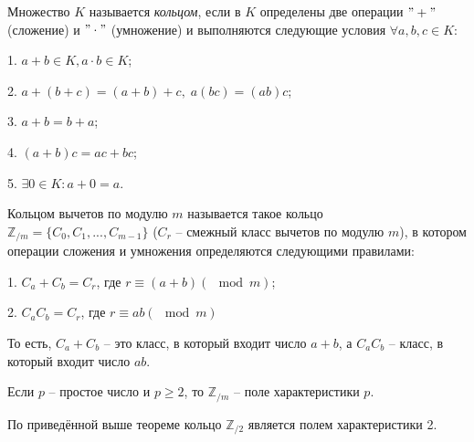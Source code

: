 Множество $K$ называется \emph{кольцом}, если в $K$ определены две операции $"+"$ (сложение) и $"\cdot"$ (умножение) и выполняются следующие условия $\forall a, b, c \in K$:

1. $a + b \in K, a \cdot b \in K$;

2. $a+(b+c) = (a+b)+c, \; a(bc) = (ab)c$;

3. $a+b = b+a$;

4. $(a+b)c = ac+bc$;

5. $\exists 0 \in K \colon a + 0 = a$.

Кольцом вычетов по модулю $m$ называется такое кольцо \\ $\mathbb{Z}_{/m} = \{C_0, C_1, ..., C_{m-1}\}$ ($C_r$ -- смежный класс вычетов по модулю $m$), в котором операции сложения и умножения определяются следующими правилами:

1. $C_a + C_b = C_r$, \; где $r \equiv (a+b)(\!\!\!\!\mod m)$;

2. $C_a C_b = C_r$, \; где $r \equiv ab(\!\!\!\!\mod m)$

То есть, $C_a + C_b$ -- это класс, в который входит число $a+b$, а $C_a C_b$ -- класс, в который входит число $ab$.


\begin{theorem}
Если $p$ -- простое число и $p \ge 2$, то $\mathbb{Z}_{/m}$ -- поле характеристики $p$.
\end{theorem}

По приведённой выше теореме кольцо $\mathbb{Z}_{/2}$ является полем характеристики 2.